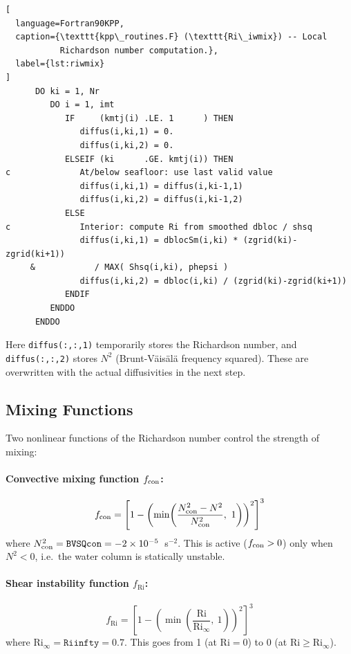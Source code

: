 \documentclass[12pt,letterpaper]{article}
\newcommand{\Ri}{\mathrm{Ri}}
\begin{document}
\begin{lstlisting}[  
  language=Fortran90KPP,  
  caption={\texttt{kpp\_routines.F} (\texttt{Ri\_iwmix}) -- Local  
           Richardson number computation.},  
  label={lst:riwmix}  
]  
      DO ki = 1, Nr  
         DO i = 1, imt  
            IF     (kmtj(i) .LE. 1      ) THEN  
               diffus(i,ki,1) = 0.  
               diffus(i,ki,2) = 0.  
            ELSEIF (ki      .GE. kmtj(i)) THEN  
c              At/below seafloor: use last valid value  
               diffus(i,ki,1) = diffus(i,ki-1,1)  
               diffus(i,ki,2) = diffus(i,ki-1,2)  
            ELSE  
c              Interior: compute Ri from smoothed dbloc / shsq  
               diffus(i,ki,1) = dblocSm(i,ki) * (zgrid(ki)-zgrid(ki+1))  
     &            / MAX( Shsq(i,ki), phepsi )  
               diffus(i,ki,2) = dbloc(i,ki) / (zgrid(ki)-zgrid(ki+1))  
            ENDIF  
         ENDDO  
      ENDDO  
\end{lstlisting}  
  
Here \texttt{diffus(:,:,1)} temporarily stores the Richardson number,  
and \texttt{diffus(:,:,2)} stores $N^2$ (Brunt-V\"{a}is\"{a}l\"{a}  
frequency squared). These are overwritten with the actual diffusivities  
in the next step.  
  
\subsection{Mixing Functions}  
  
Two nonlinear functions of the Richardson number control the strength  
of mixing:  
  
\paragraph{Convective mixing function $f_{\rm con}$:}  
\begin{equation}  
f_{\rm con} = \left[1 - \left(\min\!\left(\frac{N^2_{\rm con} - N^2}{N^2_{\rm con}},\  
1\right)\right)^2\right]^3  
\end{equation}  
where $N^2_{\rm con} = \texttt{BVSQcon} = -2\times10^{-5}$~s$^{-2}$.  
This is active ($f_{\rm con} > 0$) only when $N^2 < 0$, i.e.\ the  
water column is statically unstable.  
  
\paragraph{Shear instability function $f_\Ri$:}  
\begin{equation}  
f_\Ri = \left[1 - \left(\min\!\left(\frac{\Ri}{\Ri_\infty},\ 1\right)\right)^2\right]^3  
\end{equation}  
where $\Ri_\infty = \texttt{Riinfty} = 0.7$. This goes from 1 (at  
$\Ri = 0$) to 0 (at $\Ri \geq \Ri_\infty$).  
  
\end{document}
